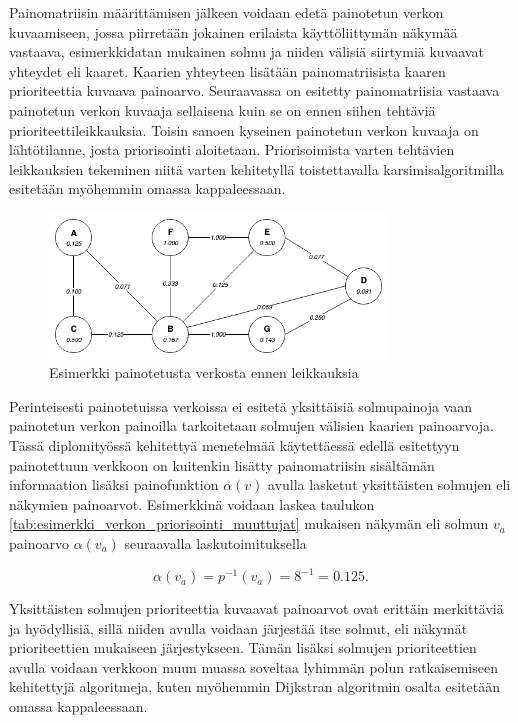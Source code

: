   Painomatriisin määrittämisen jälkeen voidaan edetä painotetun verkon kuvaamiseen, jossa piirretään jokainen erilaista käyttöliittymän näkymää vastaava, esimerkkidatan mukainen solmu ja niiden välisiä siirtymiä kuvaavat yhteydet eli kaaret.
  Kaarien yhteyteen lisätään painomatriisista kaaren prioriteettia kuvaava painoarvo.
  Seuraavassa on esitetty painomatriisia vastaava painotetun verkon kuvaaja sellaisena kuin se on ennen siihen tehtäviä prioriteettileikkauksia.
  Toisin sanoen kyseinen painotetun verkon kuvaaja on lähtötilanne, josta priorisointi aloitetaan.
  Priorisoimista varten tehtävien leikkauksien tekeminen niitä varten kehitetyllä toistettavalla karsimisalgoritmilla esitetään myöhemmin omassa kappaleessaan.

  \begin{figure}[H]
    \centering
    \includegraphics[width=0.8\textwidth]{assets/painotettu-verkko-ennen.png}
    \caption{Esimerkki painotetusta verkosta ennen leikkauksia}
    \label{fig:painotettu-verkko-ennen}
  \end{figure}

  Perinteisesti painotetuissa verkoissa ei esitetä yksittäisiä solmupainoja vaan painotetun verkon painoilla tarkoitetaan solmujen välisien kaarien painoarvoja.
  Tässä diplomityössä kehitettyä menetelmää käytettäessä edellä esitettyyn painotettuun verkkoon on kuitenkin lisätty painomatriisin sisältämän informaation lisäksi painofunktion \(\alpha(v)\) avulla lasketut yksittäisten solmujen eli näkymien painoarvot.
  Esimerkkinä voidaan laskea taulukon \ref{tab:esimerkki_verkon_priorisointi_muuttujat} mukaisen näkymän eli solmun \(v_a\) painoarvo \(\alpha(v_a)\) seuraavalla laskutoimituksella

  \begin{equation} \label{eq:5_5_3}
    \alpha(v_a) = p^{-1}(v_a) = 8^{-1}  = 0.125
    \text{.}
  \end{equation}

  Yksittäisten solmujen prioriteettia kuvaavat painoarvot ovat erittäin merkittäviä ja hyödyllisiä, sillä niiden avulla voidaan järjestää itse solmut, eli näkymät prioriteettien mukaiseen järjestykseen.
  Tämän lisäksi solmujen prioriteettien avulla voidaan verkkoon muun muassa soveltaa lyhimmän polun ratkaisemiseen kehitettyjä algoritmeja, kuten myöhemmin Dijkstran algoritmin osalta esitetään omassa kappaleessaan.

